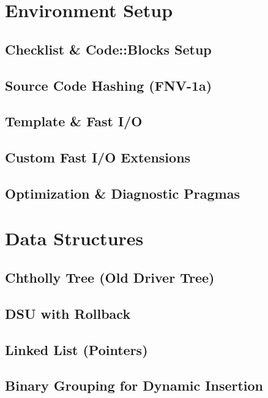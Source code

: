 \section{Environment Setup}
\subsection{Checklist \& Code::Blocks Setup}

\subsection{Source Code Hashing (FNV-1a)}

\subsection{Template \& Fast I/O}

\subsection{Custom Fast I/O Extensions}

\subsection{Optimization \& Diagnostic Pragmas}

\section{Data Structures}
\subsection{Chtholly Tree (Old Driver Tree)}

\subsection{DSU with Rollback}

\subsection{Linked List (Pointers)}

\subsection{Binary Grouping for Dynamic Insertion}

